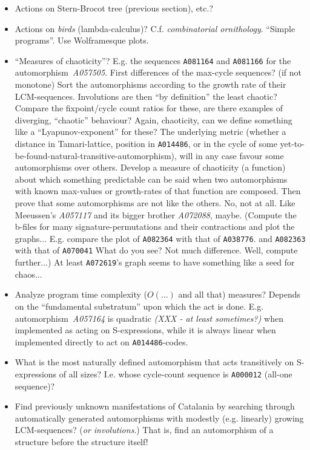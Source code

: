\documentclass[11pt]{article} %
\newcommand{\autname}[1]{{\it *#1}}
\newcommand{\automorphism}[1]{automorphism~\autname{#1}}
\newcommand{\EISseq}[1]{{\tt #1}}
\begin{document}
\begin{itemize}
\item Actions on Stern-Brocot tree (previous section), etc.?

\item Actions on {\em birds} (lambda-calculus)? C.f. {\em
        combinatorial ornithology}. ``Simple programs''.
      Use Wolframesque plots.

\item ``Measures of chaoticity''? E.g. the sequences \EISseq{A081164}
and \EISseq{A081166} for the \automorphism{A057505}.
First differences of the max-cycle sequences? (if not monotone)
Sort the automorphisms according to the growth rate of their
LCM-sequences. Involutions are then ``by definition'' the least
chaotic? Compare the fixpoint/cycle count ratios for these,
are there examples of diverging, ``chaotic'' behaviour?
Again, chaoticity, can we define
something like a ``Lyapunov-exponent'' for these?
The underlying metric (whether a distance in Tamari-lattice,
position in \EISseq{A014486}, or in the cycle
of some yet-to-be-found-natural-transitive-automorphism),
will in any case favour some automorphisms over others.
Develop a measure of chaoticity (a function) about
which something predictable can be said when two
automorphisms with known max-values or growth-rates
of that function are composed. Then prove that
some automorphisms are not like the others.
No, not at all. Like Meeussen's \autname{A057117} and its
bigger brother \autname{A072088}, maybe.
(Compute the b-files for many signature-permutations
and their contractions and plot the graphs...
E.g. compare the plot of \EISseq{A082364} with that of \EISseq{A038776}.
and \EISseq{A082363} with that of \EISseq{A070041}
What do you see? Not much difference. Well, compute further...)
At least \EISseq{A072619}'s graph seems to have something like a seed for chaos...

\item Analyze program time complexity ($O(...)$ and all that) measures?
Depends on the ``fundamental substratum'' upon which the
act is done. E.g. \automorphism{A057164} is quadratic {\em (XXX - at least sometimes?)}
when implemented as acting on S-expressions, while it is always
linear when implemented directly to act on \EISseq{A014486}-codes.

\item What is the most naturally defined automorphism that acts
transitively on S-expressions of all sizes? I.e. whose cycle-count
sequence is \EISseq{A000012} (all-one sequence)?

\item Find previously unknown manifestations of Catalania by searching
through automatically generated automorphisms with modestly (e.g. linearly) growing
LCM-sequences? ({\em or involutions}.) That is, find an automorphism of a structure
before the structure itself!


\end{itemize}
\end{document}
